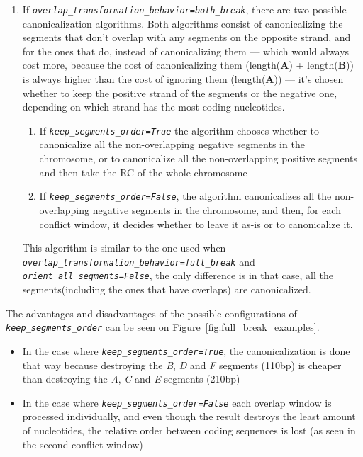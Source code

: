 \documentclass[   ]{article}
\let\oldtexttt\texttt
\renewcommand{\texttt}[1]{\oldtexttt{\itshape #1}}
\begin{document}
\begin{enumerate}
	\item If \texttt{overlap\_transformation\_behavior=both\_break}, there are two possible canonicalization algorithms. Both algorithms consist of canonicalizing the segments that don't overlap with any segments on the opposite strand, and for the ones that do, instead of canonicalizing them --- which would always cost more, because the cost of canonicalizing them (length(\textbf{A}) + length(\textbf{B})) is always higher than the cost of ignoring them (length(\textbf{A})) --- it's chosen whether to keep the positive strand of the segments or the negative one, depending on which strand has the most coding nucleotides.
	\begin{enumerate}
		\item If \texttt{keep\_segments\_order=True} the algorithm chooses whether to canonicalize all the non-overlapping negative segments in the chromosome, or to canonicalize all the non-overlapping positive segments and then take the RC of the whole chromosome
		\item If \texttt{keep\_segments\_order=False}, the algorithm canonicalizes all the non-overlapping negative segments in the chromosome, and then, for each conflict window, it decides whether to leave it as-is or to canonicalize it.
	\end{enumerate}
	
	This algorithm is similar to the one used when \texttt{overlap\_transformation\_behavior=full\_break} and \texttt{orient\_all\_segments=False}, the only difference is in that case, all the segments(including the ones that have overlaps) are canonicalized.
\end{enumerate}

The advantages and disadvantages of the possible configurations of
\texttt{keep\_segments\_order} can be seen on Figure~\ref{fig:full_break_examples}.
\begin{itemize}
	\item In the case where \texttt{keep\_segments\_order=True}, the canonicalization is done that way because destroying the \emph{B}, \emph{D} and \emph{F} segments (110bp) is cheaper than destroying the \emph{A}, \emph{C} and \emph{E} segments (210bp)
	\item In the case where \texttt{keep\_segments\_order=False} each overlap window is processed individually, and even though the result destroys the least amount of nucleotides, the relative order between coding sequences is lost (as seen in the second conflict window)
\end{itemize}
\end{document}
